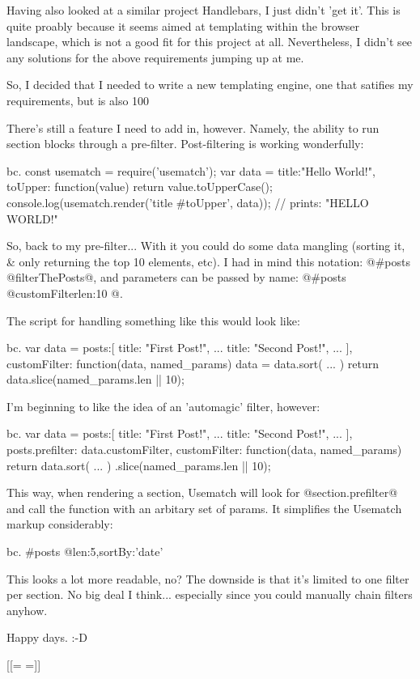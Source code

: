  Having also looked at a similar project Handlebars, I just didn't 'get it'. This is quite proably because it seems aimed at templating within the browser landscape, which is not a good fit for this project at all. Nevertheless, I didn't see any solutions for the above requirements jumping up at me.

So, I decided that I needed to write a new templating engine, one that satifies my requirements, but is also 100%

There's still a feature I need to add in, however. Namely, the ability to run section blocks through a pre-filter. Post-filtering is working wonderfully:

bc. const usematch = require('usematch');
var data = {
	title:"Hello World!",
	toUpper: function(value) { return value.toUpperCase(); }
}	
console.log(usematch.render('{{title #toUpper}}', data));
// prints: "HELLO WORLD!"

So, back to my pre-filter... With it you could do some data mangling (sorting it, & only returning the top 10 elements, etc). I had in mind this notation: @{{#posts @filterThePosts}}@, and parameters can be passed by name: @{{#posts @customFilter{len:10} }}@.

The script for handling something like this would look like:

bc. var data = {
	posts:[
		{ title: "First Post!", ...}
		{ title: "Second Post!", ...}
	],
	customFilter: function(data, named_params) {
		data = data.sort( ... )
		return data.slice(named_params.len || 10);
	}
}

I'm beginning to like the idea of an 'automagic' filter, however:

bc. var data = {
	posts:[
		{ title: "First Post!", ...}
		{ title: "Second Post!", ...}
	],
	posts.prefilter: data.customFilter,
	customFilter: function(data, named_params) {
		return data.sort( ... )
			.slice(named_params.len || 10);
	}
}

This way, when rendering a section, Usematch will look for @section.prefilter@ and call the function with an arbitary set of params. It simplifies the Usematch markup considerably:

bc. {{#posts @{len:5,sortBy:'date'} }}

This looks a lot more readable, no? The downside is that it's limited to one filter per section. No big deal I think... especially since you could manually chain filters anyhow.

Happy days. :-D

[[={{ }}=]]
